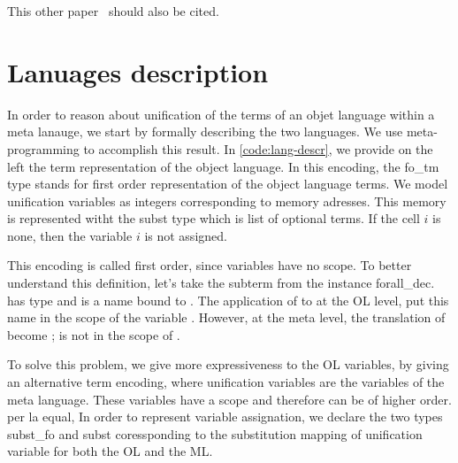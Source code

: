 \documentclass[sigconf,natbib=false]{acmart}
\begin{document}
This other paper~\cite{10.1007/978-3-031-38499-8_25} should also be cited.

\section{Lanuages description}




In order to reason about unification of the terms of an objet language within a
meta lanauge, we start by formally describing the two languages. We use
meta-programming to accomplish this result. In \cref{code:lang-descr}, we
provide on the left the term representation of the object language. %
In this encoding, the fo\_tm type stands for first order representation of the
object language terms. We model unification variables as integers corresponding
to memory adresses. This memory is represented witht the subst type which is 
list of optional terms. If the cell $i$ is none, then the variable $i$ is not
assigned. 

This encoding is called first order, since variables have no scope. To better
understand this definition, let's take the subterm  from the instance
forall\_dec.  has type  and  is a name
bound to . The application of  to  at the OL level,
put this name in the scope of the variable . However, at the meta
level, the translation of  become ; 
is not in the scope of .

To solve this problem, we give more expressiveness to the OL variables, by
giving an alternative term encoding, where unification variables are the
variables of the meta language. These variables have a scope and therefore
can be of higher order.
per la equal, 
In order to represent variable assignation, we declare the two types subst\_fo
and subst coressponding to the substitution mapping of unification variable
for both the OL and the ML.

\def\eqfo{equal\_fo\xspace}
\def\eqho{equal\_ho\xspace}
\def\etabeta{$\eta\beta$\xspace}
\end{document}
